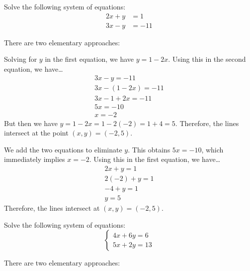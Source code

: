 \documentclass[11pt,letterpaper]{article}
\begin{document}

 Solve the following system of equations:
	\[
	\begin{aligned}
	2x + y&= 1 \\
	3x - y&= -11
	\end{aligned}
	\] \pspace

\sol There are two elementary approaches: \pspace

 Solving for $y$ in the first equation, we have $y= 1 - 2x$. Using this in the second equation, we have\dots
	\[
	\begin{gathered}
	3x - y= -11 \\[0.3cm]
	3x - (1 - 2x)= -11 \\[0.3cm]
	3x - 1 + 2x= -11 \\[0.3cm]
	5x= -10 \\[0.3cm]
	x= -2
	\end{gathered}
	\]
But then we have $y= 1 - 2x= 1 - 2(-2)= 1 + 4= 5$. Therefore, the lines intersect at the point $(x, y)= (-2, 5)$. \pspace

 We add the two equations to eliminate $y$. This obtains $5x= -10$, which immediately implies $x= -2$. Using this in the first equation, we have\dots
	\[
	\begin{gathered}
	2x + y= 1 \\[0.3cm]
	2(-2) + y= 1 \\[0.3cm]
	-4 + y= 1 \\[0.3cm]
	y= 5
	\end{gathered}	
	\]
Therefore, the lines intersect at $(x, y)= (-2, 5)$. 



\newpage



 Solve the following system of equations:
	\[
	\begin{cases}
	4x + 6y= 6 \\
	5x + 2y= 13
	\end{cases}
	\]

\sol There are two elementary approaches: \pspace
\end{document}

